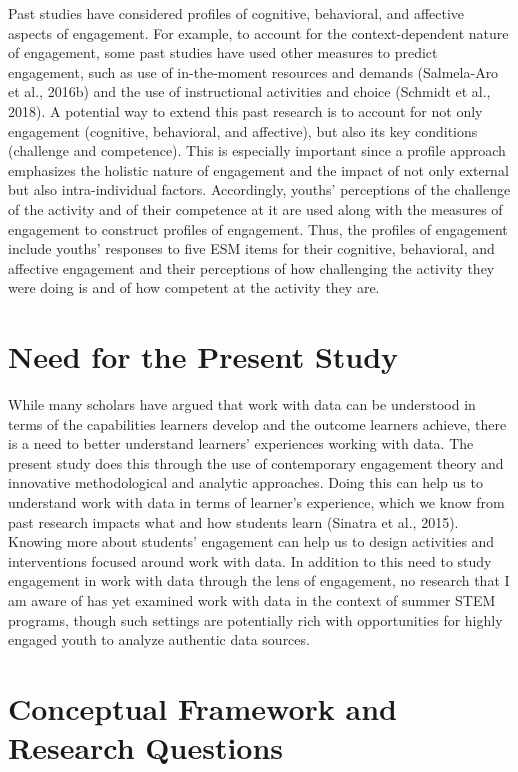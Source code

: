 \documentclass[]{book}
\theoremstyle{definition}
\theoremstyle{definition}
\theoremstyle{definition}
\theoremstyle{remark}
\begin{document}
Past studies have considered profiles of cognitive, behavioral, and
affective aspects of engagement. For example, to account for the
context-dependent nature of engagement, some past studies have used
other measures to predict engagement, such as use of in-the-moment
resources and demands (Salmela-Aro et al., 2016b) and the use of
instructional activities and choice (Schmidt et al., 2018). A potential
way to extend this past research is to account for not only engagement
(cognitive, behavioral, and affective), but also its key conditions
(challenge and competence). This is especially important since a profile
approach emphasizes the holistic nature of engagement and the impact of
not only external but also intra-individual factors. Accordingly,
youths' perceptions of the challenge of the activity and of their
competence at it are used along with the measures of engagement to
construct profiles of engagement. Thus, the profiles of engagement
include youths' responses to five ESM items for their cognitive,
behavioral, and affective engagement and their perceptions of how
challenging the activity they were doing is and of how competent at the
activity they are.

\section{Need for the Present Study}\label{need-for-the-present-study}

While many scholars have argued that work with data can be understood in
terms of the capabilities learners develop and the outcome learners
achieve, there is a need to better understand learners' experiences
working with data. The present study does this through the use of
contemporary engagement theory and innovative methodological and
analytic approaches. Doing this can help us to understand work with data
in terms of learner's experience, which we know from past research
impacts what and how students learn (Sinatra et al., 2015). Knowing more
about students' engagement can help us to design activities and
interventions focused around work with data. In addition to this need to
study engagement in work with data through the lens of engagement, no
research that I am aware of has yet examined work with data in the
context of summer STEM programs, though such settings are potentially
rich with opportunities for highly engaged youth to analyze authentic
data sources.

\section{Conceptual Framework and Research
Questions}\label{conceptual-framework-and-research-questions}
\end{document}
